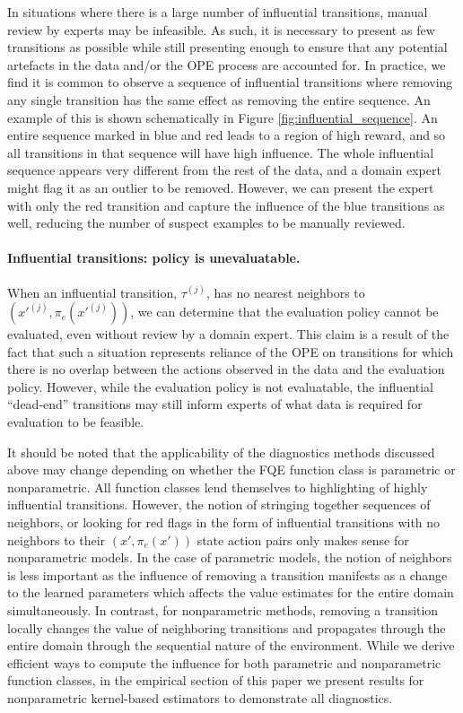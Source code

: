 \documentclass{article}
\begin{document}
In situations where there is a large number of influential transitions, manual review by experts may be infeasible. As such, it is necessary to present as few transitions as possible while still presenting enough to ensure that any potential artefacts in the data and/or the OPE process are accounted for. In practice, we find it is common to observe a sequence of influential transitions where removing any single transition has the same effect as removing the entire sequence. An example of this is shown schematically in Figure \ref{fig:influential_sequence}. An entire sequence marked in blue and red leads to a region of high reward, and so all transitions in that sequence will have high influence. The whole influential sequence appears very different from the rest of the data, and a domain expert might flag it as an outlier to be removed. However, we can present the expert with only the red transition and capture the influence of the blue transitions as well, reducing the number of suspect examples to be manually reviewed.

\paragraph{Influential transitions: policy is unevaluatable.}  When an influential transition, $\tau^{(j)}$, has no nearest neighbors to $(x'^{(j)}, \pi_e(x'^{(j)}))$, we can determine that the evaluation policy cannot be evaluated, even without review by a domain expert. This claim is a result of the fact that such a situation represents reliance of the OPE on transitions for which there is no overlap between the actions observed in the data and the evaluation policy. However, while the evaluation policy is not evaluatable, the influential ``dead-end'' transitions may still inform experts of what data is required for evaluation to be feasible.

It should be noted that the applicability of the diagnostics methods discussed above may change depending on whether the FQE function class is parametric or nonparametric. All function classes lend themselves to highlighting of highly influential transitions. However, the notion of stringing together sequences of neighbors, or looking for red flags in the form of influential transitions with no neighbors to their $(x', \pi_e(x'))$ state action pairs only makes sense for nonparametric models. In the case of parametric models, the notion of neighbors is less important as the influence of removing a transition manifests as a change to the learned parameters which affects the value estimates for the entire domain simultaneously. In contrast, for nonparametric methods, removing a transition locally changes the value of neighboring transitions and propagates through the entire domain through the sequential nature of the environment. While we derive efficient ways to compute the influence for both parametric and nonparametric function classes, in the empirical section of this paper we present results for nonparametric kernel-based estimators to demonstrate all diagnostics.
\end{document}
